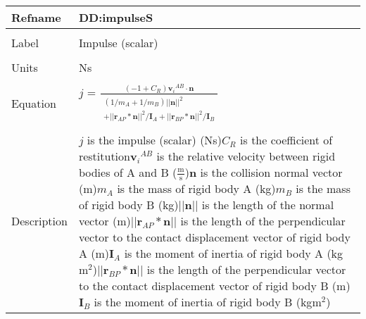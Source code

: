 \documentclass[12pt]{article}
\begin{document}
\noindent \begin{minipage}{\textwidth}
\begin{tabular}{p{} p{}}
\toprule \textbf{Refname} & \textbf{DD:impulseS}
\label{DD:impulseS}
\\ \midrule \\
Label & Impulse (scalar)
\\ \midrule \\
Units & Ns
\\ \midrule \\
Equation & $j$ = $\frac{\left(-1+{C_{R}}\right) {{\mathbf{v}_{i}}^{AB}}\cdot{}\mathbf{n}}{\begin{multlined}
\left(1/{m_{A}}+1/{m_{B}}\right) ||\mathbf{n}||^{2}
\\+
||{\mathbf{r}_{AP}}*\mathbf{n}||^{2}/{\mathbf{I}_{A}}+||{\mathbf{r}_{BP}}*\mathbf{n}||^{2}/{\mathbf{I}_{B}}
\end{multlined}
}$
\\ \midrule \\
Description & $j$ is the impulse (scalar) (Ns)\newline${C_{R}}$ is the coefficient of restitution\newline${{\mathbf{v}_{i}}^{AB}}$ is the relative velocity between rigid bodies of A and B ($\frac{\text{m}}{\text{s}}$)\newline$\mathbf{n}$ is the collision normal vector (m)\newline${m_{A}}$ is the mass of rigid body A (kg)\newline${m_{B}}$ is the mass of rigid body B (kg)\newline$||\mathbf{n}||$ is the length of the normal vector (m)\newline$||{\mathbf{r}_{AP}}*\mathbf{n}||$ is the length of the perpendicular vector to the contact displacement vector of rigid body A (m)\newline${\mathbf{I}_{A}}$ is the moment of inertia of rigid body A (kg$\text{m}^{2}$)\newline$||{\mathbf{r}_{BP}}*\mathbf{n}||$ is the length of the perpendicular vector to the contact displacement vector of rigid body B (m)\newline${\mathbf{I}_{B}}$ is the moment of inertia of rigid body B (kg$\text{m}^{2}$)
\\ \bottomrule \end{tabular}
\end{minipage}\\
\end{document}

